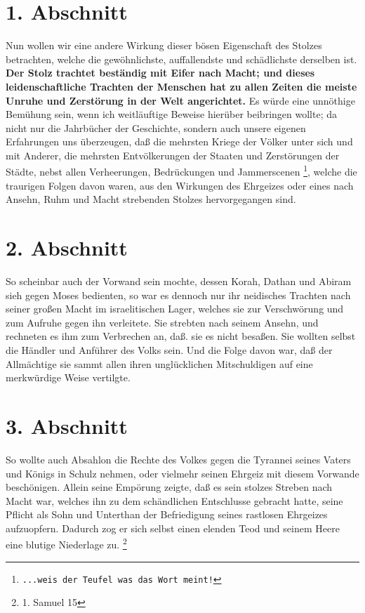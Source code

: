 \section{1. Abschnitt} \label{kap8_ab1}

Nun wollen wir eine andere Wirkung dieser bösen Eigenschaft des Stolzes
betrachten, welche die gewöhnlichste, auffallendste und schädlichste derselben
ist.
\textbf{
    Der Stolz trachtet beständig mit Eifer nach Macht; und dieses leidenschaftliche Trachten der Menschen hat zu allen Zeiten die meiste Unruhe und Zerstörung in der Welt angerichtet.
}Es würde eine unnöthige Bemühung sein,
wenn ich weitläuftige Beweise hierüber beibringen wollte; da nicht nur die
Jahrbücher der Geschichte, sondern auch unsere eigenen Erfahrungen uns
überzeugen, daß die mehrsten Kriege der Völker unter sich und mit Anderer, die
mehrsten Entvölkerungen der Staaten und Zerstörungen der Städte, nebst allen
Verheerungen, Bedrückungen und Jammerscenen
\footnote{\texttt{...weis der Teufel was das Wort meint!}},
welche die traurigen Folgen davon waren, aus den Wirkungen des
Ehrgeizes oder eines nach Ansehn, Ruhm und Macht strebenden Stolzes
hervorgegangen sind.

\section{2. Abschnitt} \label{kap8_ab2}

So scheinbar auch der Vorwand sein mochte, dessen Korah, Dathan und Abiram sieh
gegen Moses bedienten, so war es dennoch nur ihr neidisches Trachten nach seiner
großen Macht im israelitischen Lager, welches sie zur Verschwörung und zum
Aufruhe gegen ihn verleitete. Sie strebten nach seinem Ansehn, und rechneten es
ihm zum Verbrechen an, daß. sie es nicht besaßen. Sie wollten selbst die Händler
und Anführer des Volks sein. Und die Folge davon war, daß der Allmächtige sie
sammt allen ihren unglücklichen Mitschuldigen auf eine merkwürdige Weise
vertilgte.

\section{3. Abschnitt} \label{kap8_ab3}

So wollte auch Absahlon die Rechte des Volkes gegen die Tyrannei seines Vaters
und Königs in Schulz nehmen, oder vielmehr seinen Ehrgeiz mit diesem Vorwande
beschönigen. Allein seine Empörung zeigte, daß es sein stolzes Streben nach
Macht war, welches ihn zu dem schändlichen Entschlusse gebracht hatte, seine
Pflicht als Sohn und Unterthan der Befriedigung seines rastlosen Ehrgeizes
aufzuopfern. Dadurch zog er sich selbst einen elenden Teod und seinem Heere eine
blutige Niederlage zu.
\footnote{1. Samuel 15}

